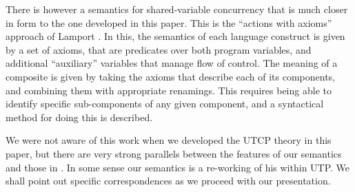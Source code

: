 There is however a semantics for shared-variable concurrency
that is much closer in form to the one developed in this paper.
This is the ``actions with axioms'' approach of Lamport \cite{Lamport1985}.
In this, the semantics of each language construct is given by a set
of axioms, that are predicates over both program variables,
and additional ``auxiliary'' variables that manage flow of control.
The meaning of a composite is given by taking the axioms that
describe each of its components, and combining them with appropriate
renamings.
This requires being able to identify specific sub-components
of any given component, and a syntactical method for doing this
is described.

We were not aware of this work when we developed the UTCP theory
in this paper,
but there are very strong parallels between the features of our
semantics and those in \cite{Lamport1985}.
In some sense our semantics is a re-working of his within UTP.
We shall point out specific correspondences as we proceed with our presentation.
